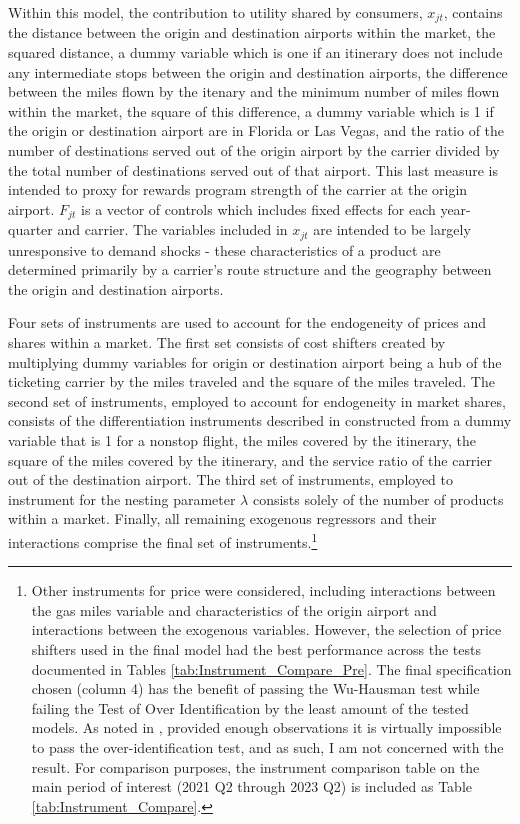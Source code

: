 \documentclass{article}
\begin{document}
	Within this model, the contribution to utility shared by consumers, $x_{jt}$, contains the distance between the origin and destination airports within the market, the squared distance, a dummy variable which is one if an itinerary does not include any intermediate stops between the origin and destination airports, the difference between the miles flown by the itenary and the minimum number of miles flown within the market, the square of this difference, a dummy variable which is 1 if the origin or destination airport are in Florida or Las Vegas, and the ratio of the number of destinations served out of the origin airport by the carrier divided by the total number of destinations served out of that airport. This last measure is intended to proxy for rewards program strength of the carrier at the origin airport. $F_{jt}$ is a vector of controls which includes fixed effects for each year-quarter and carrier. The variables included in $x_{jt}$ are intended to be largely unresponsive to demand shocks - these characteristics of a product are determined primarily by a carrier's route structure and the geography between the origin and destination airports. 
	
	 Four sets of instruments are used to account for the endogeneity of prices and shares within a market. The first set consists of cost shifters created by multiplying dummy variables for origin or destination airport being a hub of the ticketing carrier by the miles traveled and the square of the miles traveled. The second set of instruments, employed to account for endogeneity in market shares, consists of the differentiation instruments described in \citet{gandhi_measuring_2019} constructed from a dummy variable that is 1 for a nonstop flight, the miles covered by the itinerary, the square of the miles covered by the itinerary, and the service ratio of the carrier out of the destination airport. The third set of instruments, employed to instrument for the nesting parameter $\lambda$ consists solely of the number of products within a market. Finally, all remaining exogenous regressors and their interactions comprise the final set of instruments.\footnote{Other instruments for price were considered, including interactions between the gas miles variable and characteristics of the origin airport and interactions between the exogenous variables. However, the selection of price shifters used in the final model had the best performance across the tests documented in Tables \ref{tab:Instrument_Compare_Pre}. The final specification chosen (column 4) has the benefit of passing the Wu-Hausman test while failing the Test of Over Identification by the least amount of the tested models. As noted in \citet{nevo_measuring_2001}, provided enough observations it is virtually impossible to pass the over-identification test, and as such, I am not concerned with the result. For comparison purposes, the instrument comparison table on the main period of interest (2021 Q2 through 2023 Q2) is included as Table \ref{tab:Instrument_Compare}.}
	
\end{document}
